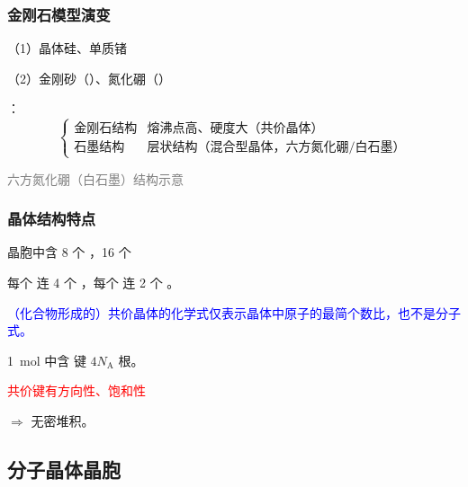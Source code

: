             \subsubsection{金刚石模型演变}

                （1）晶体硅、单质锗

                （2）金刚砂（）、氮化硼（）

                ：
                \[
                    \left\{
                    \begin{array}{ll}
                        金刚石结构 & \text{熔沸点高、硬度大（共价晶体）}\\
                        石墨结构 & \text{层状结构（混合型晶体，六方氮化硼/白石墨）}
                    \end{array}
                    \right.
                \]

                \noindent\begin{minipage}[t]{0.35\textwidth}
                    \centering

                    \footnotesize\textcolor{gray}{六方氮化硼（白石墨）结构示意}
                \end{minipage}


            \subsubsection{\texorpdfstring{}{SiO2} 晶体结构特点}

                 晶胞中含 8 个 ，16 个 

                 每个  连 4 个 ，每个  连 2 个 。

                \textcolor{blue}{（化合物形成的）共价晶体的化学式仅表示晶体中原子的最简个数比，也不是分子式。}

                 \SI{1}{\mole}  中含  键 \(4N_\text{A}\) 根。

                \textcolor{red}{共价键有方向性、饱和性}

                \(\Rightarrow\) 无密堆积。

        \subsection{分子晶体晶胞}\label{subsec:分子晶体晶胞}

